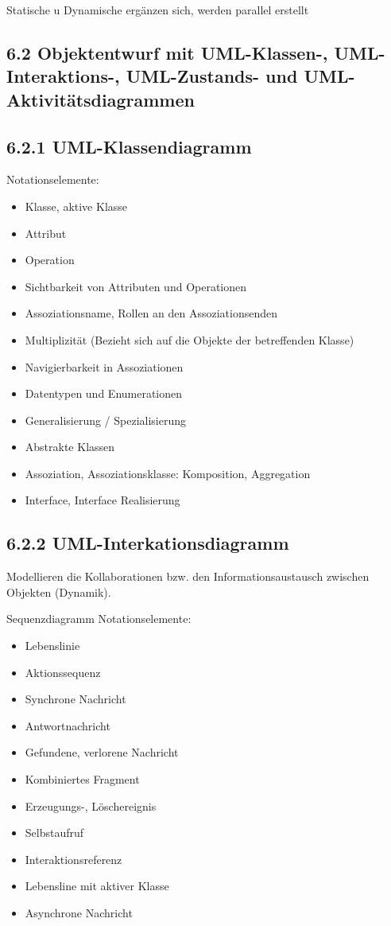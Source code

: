Statische u Dynamische ergänzen sich, werden parallel erstellt

\subsection*{6.2 Objektentwurf mit UML-Klassen-, UML-Interaktions-, UML-Zustands- und UML-Aktivitätsdiagrammen}
\subsection*{6.2.1 UML-Klassendiagramm}
Notationselemente:

\begin{itemize}
  \item Klasse, aktive Klasse
  \item Attribut
  \item Operation
  \item Sichtbarkeit von Attributen und Operationen
  \item Assoziationsname, Rollen an den Assoziationsenden
  \item Multiplizität (Bezieht sich auf die Objekte der betreffenden Klasse)
  \item Navigierbarkeit in Assoziationen
  \item Datentypen und Enumerationen
  \item Generalisierung / Spezialisierung
  \item Abstrakte Klassen
  \item Assoziation, Assoziationsklasse: Komposition, Aggregation
  \item Interface, Interface Realisierung
\end{itemize}

\subsection*{6.2.2 UML-Interkationsdiagramm}
Modellieren die Kollaborationen bzw. den Informationsaustausch zwischen Objekten (Dynamik).

Sequenzdiagramm Notationselemente:

\begin{itemize}
  \item Lebenslinie
  \item Aktionssequenz
  \item Synchrone Nachricht
  \item Antwortnachricht
  \item Gefundene, verlorene Nachricht
  \item Kombiniertes Fragment
  \item Erzeugungs-, Löschereignis
  \item Selbstaufruf
  \item Interaktionsreferenz
  \item Lebensline mit aktiver Klasse
  \item Asynchrone Nachricht
\end{itemize}

